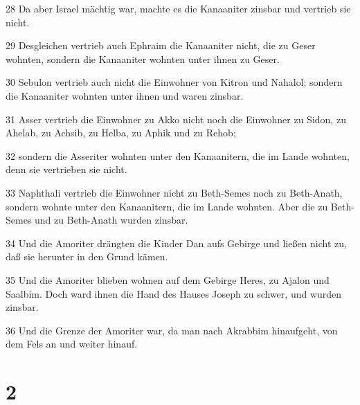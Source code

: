 \par 28 Da aber Israel mächtig war, machte es die Kanaaniter zinsbar und vertrieb sie nicht.
\par 29 Desgleichen vertrieb auch Ephraim die Kanaaniter nicht, die zu Geser wohnten, sondern die Kanaaniter wohnten unter ihnen zu Geser.
\par 30 Sebulon vertrieb auch nicht die Einwohner von Kitron und Nahalol; sondern die Kanaaniter wohnten unter ihnen und waren zinsbar.
\par 31 Asser vertrieb die Einwohner zu Akko nicht noch die Einwohner zu Sidon, zu Ahelab, zu Achsib, zu Helba, zu Aphik und zu Rehob;
\par 32 sondern die Asseriter wohnten unter den Kanaanitern, die im Lande wohnten, denn sie vertrieben sie nicht.
\par 33 Naphthali vertrieb die Einwohner nicht zu Beth-Semes noch zu Beth-Anath, sondern wohnte unter den Kanaanitern, die im Lande wohnten. Aber die zu Beth-Semes und zu Beth-Anath wurden zinsbar.
\par 34 Und die Amoriter drängten die Kinder Dan aufs Gebirge und ließen nicht zu, daß sie herunter in den Grund kämen.
\par 35 Und die Amoriter blieben wohnen auf dem Gebirge Heres, zu Ajalon und Saalbim. Doch ward ihnen die Hand des Hauses Joseph zu schwer, und wurden zinsbar.
\par 36 Und die Grenze der Amoriter war, da man nach Akrabbim hinaufgeht, von dem Fels an und weiter hinauf.

\chapter{2}

